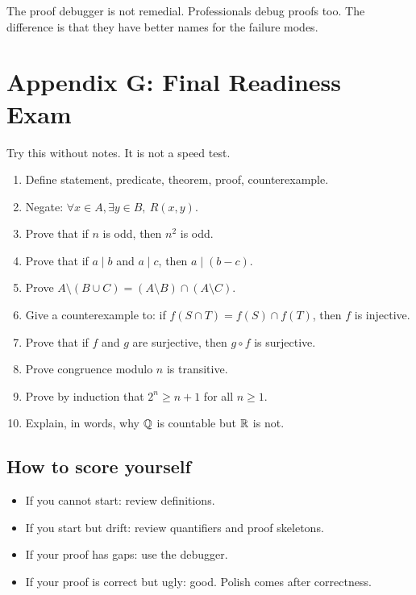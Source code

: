 \documentclass[11pt]{article}
\begin{document}
\begin{focusbox}
The proof debugger is not remedial. Professionals debug proofs too. The difference is that they have better names for the failure modes.
\end{focusbox}

\newpage
\section{Appendix G: Final Readiness Exam}

Try this without notes. It is not a speed test.

\begin{enumerate}
\item Define statement, predicate, theorem, proof, counterexample.
\item Negate: $\forall x\in A,\exists y\in B,\ R(x,y)$.
\item Prove that if $n$ is odd, then $n^2$ is odd.
\item Prove that if $a\mid b$ and $a\mid c$, then $a\mid(b-c)$.
\item Prove $A\setminus(B\cup C)=(A\setminus B)\cap(A\setminus C)$.
\item Give a counterexample to: if $f(S\cap T)=f(S)\cap f(T)$, then $f$ is injective.
\item Prove that if $f$ and $g$ are surjective, then $g\circ f$ is surjective.
\item Prove congruence modulo $n$ is transitive.
\item Prove by induction that $2^n\geq n+1$ for all $n\geq1$.
\item Explain, in words, why $\mathbb{Q}$ is countable but $\mathbb{R}$ is not.
\end{enumerate}

\subsection{How to score yourself}

\begin{itemize}
\item If you cannot start: review definitions.
\item If you start but drift: review quantifiers and proof skeletons.
\item If your proof has gaps: use the debugger.
\item If your proof is correct but ugly: good. Polish comes after correctness.
\end{itemize}
\end{document}
